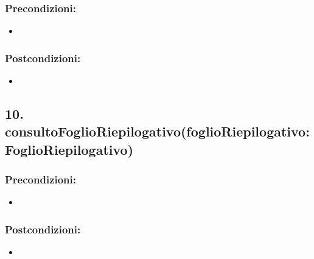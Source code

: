 \subsubsection*{Precondizioni:}
\begin{itemize}
    \item 
\end{itemize}

\subsubsection*{Postcondizioni:}
\begin{itemize}
    \item 
\end{itemize}

\subsection*{10. consultoFoglioRiepilogativo(foglioRiepilogativo:FoglioRiepilogativo)}

\subsubsection*{Precondizioni:}
\begin{itemize}
    \item 
\end{itemize}

\subsubsection*{Postcondizioni:}
\begin{itemize}
    \item 
\end{itemize}